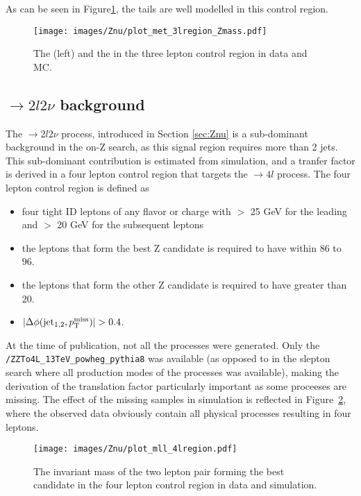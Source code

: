 As can be seen in Figure\ref{fig:WZmetOnZ}, the \ptmiss tails are well modelled in this control region.
\begin{figure}[htbp!]
\begin{center}
\texttt{[image: images/Znu/plot\_met\_3lregion\_Zmass.pdf]}
\caption{The \ptmiss (left) and the \mttwo in the three lepton control region in data and MC. }
\label{fig:WZmetOnZ}
\end{center}
\end{figure}
\subsection*{\PZZ$\rightarrow2l2\nu$ background}
\noindent
The \PZZ$\rightarrow 2l2\nu$ process, introduced in Section \ref{sec:Znu} is a sub-dominant background in the on-Z search, as this signal region requires more than 2 jets.
This sub-dominant contribution is estimated from simulation, and a tranfer factor is derived in a four lepton control region that targets the \PZZ$\rightarrow4l$ process. 
The four lepton control region is defined as
\begin{itemize}
    \item four tight ID leptons of any flavor or charge with \pt $>$ 25 GeV for the leading and \pt $>$ 20 GeV for the subsequent leptons
    \item the leptons that form the best Z candidate is required to have \mll within 86 to 96\GeV.
    \item the leptons that form the other Z candidate is required to have \mll greater than 20\GeV.
    \item $|\Delta\phi(\mathrm{jet_{1,2}}, \ptmiss)|>0.4$.
\end{itemize}
At the time of publication, not all the \PZZ processes were generated.
\noindent
\justify
Only the \texttt{/ZZTo4L\_13TeV\_powheg\_pythia8} was available (as opposed to in the slepton search where all production modes of the \PZZ processes was available), making the derivation of the translation factor particularly important as some proceeses are missing.
The effect of the missing samples in simulation is reflected in Figure~\ref{fig:ZZonZ}, where the observed data obviously contain all physical processes resulting in four leptons.
\begin{figure}[htbp!]
\begin{center}
\texttt{[image: images/Znu/plot\_mll\_4lregion.pdf]}
\caption{The invariant mass of the two lepton pair forming the best \PZ candidate in the four lepton control region in data and simulation.}
\label{fig:ZZonZ}
\end{center}
\end{figure}
